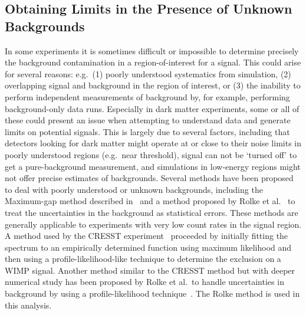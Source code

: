 	\subsection{Obtaining Limits in the Presence of Unknown Backgrounds}
	\label{sec:LimitsUnknownBackgroundML}	
	
In some experiments it is sometimes difficult or impossible to determine precisely the background contamination in a region-of-interest for a signal.  This could arise for several reasons: e.g.~(1) poorly understood systematics from simulation, (2) overlapping signal and background in the region of interest, or (3) the inability to perform independent measurements of background by, for example, performing background-only data runs.  Especially in dark matter experiments, some or all of these could present an issue when attempting to understand data and generate limits on potential signals.  This is largely due to several factors, including that detectors looking for dark matter might operate at or close to their noise limits in poorly understood regions (e.g.~near threshold), signal can not be `turned off' to get a pure-background measurement, and simulations in low-energy regions might not offer precise estimates of backgrounds.  Several methods have been proposed to deal with poorly understood or unknown backgrounds, including the Maximum-gap method described in~\cite{Yell02} and a method proposed by Rolke et al.~\cite{Rolke2001} to treat the uncertainties in the background as statistical errors.  These methods are generally applicable to experiments with very low count rates in the signal region.  A method used by the CRESST experiment~\cite{Anglo2002} proceeded by initially fitting the spectrum to an empirically determined function using maximum likelihood and then using a profile-likelihood-like technique to determine the exclusion on a WIMP signal.  Another method similar to the CRESST method but with deeper numerical study has been proposed by Rolke et al.~to handle uncertainties in background by using a profile-likelihood technique~\cite{Rol05}.  The Rolke method is used in this analysis.  

